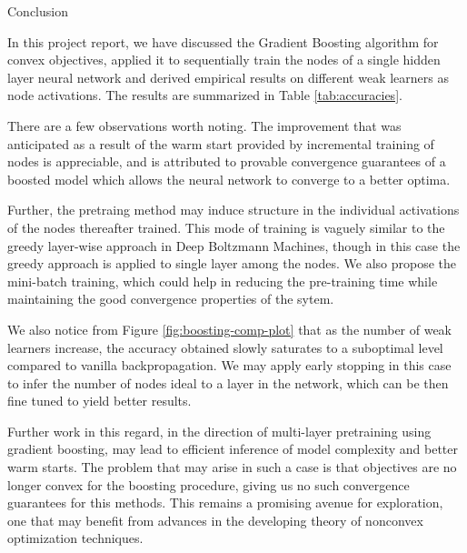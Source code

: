 \documentclass{article}
\begin{document}
\begin{psection}{Conclusion}

	In this project report, we have discussed the Gradient Boosting algorithm for convex objectives, applied it to sequentially train the nodes of a single hidden layer neural network and derived empirical results on different weak learners as node activations. The results are summarized in Table \ref{tab:accuracies}.

	There are a few observations worth noting. The improvement that was anticipated as a result of the warm start provided by incremental training of nodes is appreciable, and is attributed to provable convergence guarantees of a boosted model which allows the neural network to converge to a better optima.

	Further, the pretraing method may induce structure in the individual activations of the nodes thereafter trained. This mode of training is vaguely similar to the greedy layer-wise approach in Deep Boltzmann Machines, though in this case the greedy approach is applied to single layer among the nodes. We also propose the mini-batch training, which could help in reducing the pre-training time while maintaining the good convergence properties of the sytem.

	We also notice from Figure \ref{fig:boosting-comp-plot} that as the number of weak learners increase, the accuracy obtained slowly saturates to a suboptimal level compared to vanilla backpropagation. We may apply early stopping in this case to infer the number of nodes ideal to a layer in the network, which can be then fine tuned to yield better results.

	Further work in this regard, in the direction of multi-layer pretraining using gradient boosting, may lead to efficient inference of model complexity and better warm starts. The problem that may arise in such a case is that objectives are no longer convex for the boosting procedure, giving us no such convergence guarantees for this methods. This remains a promising avenue for exploration, one that may benefit from advances in the developing theory of nonconvex optimization techniques.

\end{psection}



\end{document}
